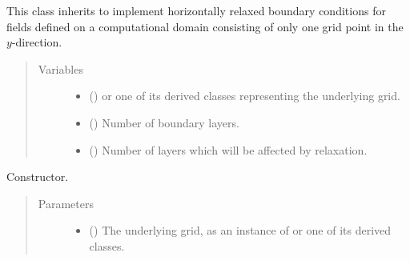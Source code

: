 \documentclass[letterpaper,10pt,english]{sphinxmanual}
\begin{document}
\begin{fulllineitems}
\label{\detokenize{api:dycore.horizontal_boundary_relaxed.RelaxedXZ}}
This class inherits  to implement horizontally relaxed boundary conditions for fields defined
on a computational domain consisting of only one grid point in the \(y\)-direction.
\begin{quote}\begin{description}
\item[{Variables}] \leavevmode\begin{itemize}
\item {} 
 () \textendash{}  or one of its derived classes representing the underlying grid.

\item {} 
{\hyperref[\detokenize{api:dycore.prognostic_isentropic.PrognosticIsentropic.nb}]{}} () \textendash{} Number of boundary layers.

\item {} 
 () \textendash{} Number of layers which will be affected by relaxation.

\end{itemize}

\end{description}\end{quote}

\begin{fulllineitems}
\label{\detokenize{api:dycore.horizontal_boundary_relaxed.RelaxedXZ.__init__}}
Constructor.
\begin{quote}\begin{description}
\item[{Parameters}] \leavevmode\begin{itemize}
\item {} 
 () \textendash{} The underlying grid, as an instance of {\hyperref[\detokenize{api:grids.grid_xyz.GridXYZ}]{}} or one of its derived classes.


\end{itemize}
\end{description}
\end{quote}
\end{fulllineitems}
\end{fulllineitems}
\end{document}
